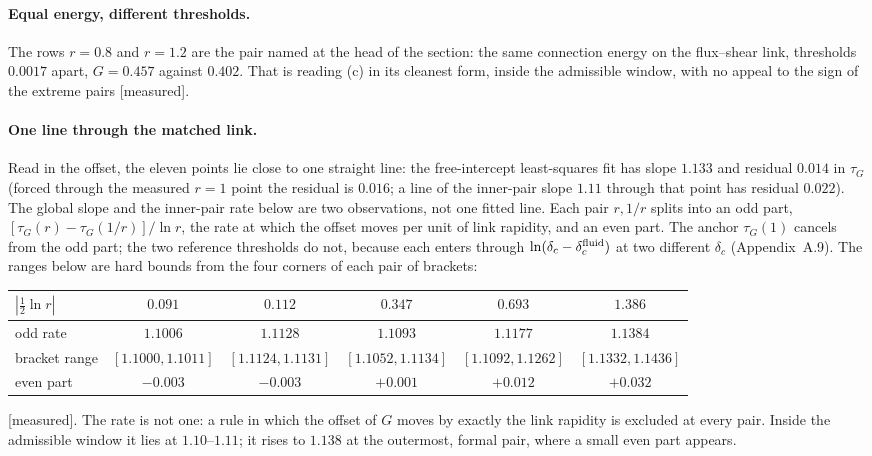 \documentclass[11pt]{article}
\newcommand{\grade}[1]{\textsf{\small[#1]}}
\begin{document}
\paragraph{Equal energy, different thresholds.} The rows $r=0.8$ and $r=1.2$ are the pair named at the head of the section: the same connection energy on the flux--shear link, thresholds $0.0017$ apart, $G=0.457$ against $0.402$. That is reading (c) in its cleanest form, inside the admissible window, with no appeal to the sign of the extreme pairs \grade{measured}.

\paragraph{One line through the matched link.} Read in the offset, the eleven points lie close to one straight line: the free-intercept least-squares fit has slope $1.133$ and residual $0.014$ in $\tau_G$ (forced through the measured $r=1$ point the residual is $0.016$; a line of the inner-pair slope $1.11$ through that point has residual $0.022$). The global slope and the inner-pair rate below are two observations, not one fitted line. Each pair $r,1/r$ splits into an odd part, $[\tau_G(r)-\tau_G(1/r)]/\ln r$, the rate at which the offset moves per unit of link rapidity, and an even part. The anchor $\tau_G(1)$ cancels from the odd part; the two reference thresholds do not, because each enters through $\ln(\delta_c-\delta_c^{\rm fluid})$ at two different $\delta_c$ (Appendix~A.9). The ranges below are hard bounds from the four corners of each pair of brackets:
\begin{center}\small\begin{tabular}{lccccc}\toprule
$|\tfrac12\ln r|$ & $0.091$ & $0.112$ & $0.347$ & $0.693$ & $1.386$\\\midrule
odd rate & $1.1006$ & $1.1128$ & $1.1093$ & $1.1177$ & $1.1384$\\
bracket range & $[1.1000,1.1011]$ & $[1.1124,1.1131]$ & $[1.1052,1.1134]$ & $[1.1092,1.1262]$ & $[1.1332,1.1436]$\\
even part & $-0.003$ & $-0.003$ & $+0.001$ & $+0.012$ & $+0.032$\\\bottomrule\end{tabular}\end{center}
\grade{measured}. The rate is not one: a rule in which the offset of $G$ moves by exactly the link rapidity is excluded at every pair. Inside the admissible window it lies at $1.10$--$1.11$; it rises to $1.138$ at the outermost, formal pair, where a small even part appears.
\end{document}
